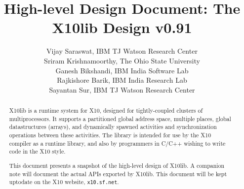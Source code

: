 \documentclass{article}
\def\Xten{{\sf X10}}
\def\Xtenlib{{\sf X10lib}}
\begin{document}
\title{High-level Design Document: The \Xtenlib{} Design v0.91}
\author{Vijay Saraswat, IBM TJ Watson Research Center \\
  Sriram Krishnamoorthy, The Ohio State University \\
  Ganesh Bikshandi, IBM India Software Lab \\
  Rajkishore Barik, IBM India Research Lab \\
  Sayantan Sur, IBM TJ Watson Research Center}

\maketitle

\thispagestyle{fancy}


\begin{abstract}
{}\Xtenlib{} is a runtime system for \Xten{}, designed for
tightly-coupled clusters of multiprocessors. It supports a partitioned
global address space, multiple places, global datastructures (arrays),
and dynamically spawned activities and synchronization operations
between these activities. The library is intended for use by the
\Xten{} compiler as a runtime library, and also by programmers in
C/C++ wishing to write code in the \Xten{} style.

This document presents a snapshot of the high-level design of
\Xtenlib{}. A companion note will document the actual APIs exported by
\Xtenlib. This document will be kept uptodate on the \Xten{} website,
{\tt x10.sf.net}.
\end{abstract}





\end{document}
